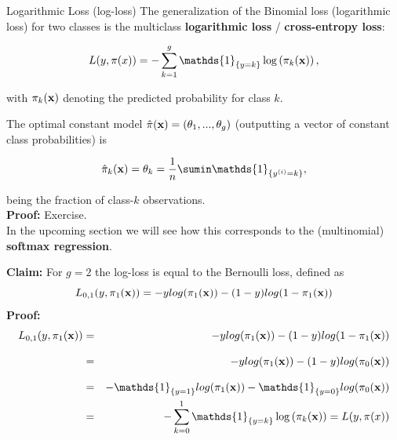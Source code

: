 \documentclass[11pt,compress,t,notes=noshow, xcolor=table]{beamer}
\begin{document}
\begin{vbframe}{Logarithmic Loss (log-loss)}
The generalization of the Binomial loss (logarithmic loss) for two classes is the multiclass \textbf{logarithmic loss} / \textbf{cross-entropy loss}:

\vspace*{-0.2cm}
\begin{footnotesize}
$$
  L(y, \pi(x)) = - \sum_{k = 1}^g \mathds{1}_{\{y = k\}} \log\left(\pi_k(\xv)\right),
$$
\end{footnotesize}
with $\pi_k(\mathbf{x})$ denoting the predicted probability for class $k$.

\vspace*{0.2cm}
 
The optimal constant model $\hat \pi(\mathbf{x}) = \left(\theta_1, ..., \theta_g\right)$ (outputting a vector of constant class probabilities) is
\begin{footnotesize}
$$
    \hat{\pi}_k(\xv) = \theta_k = \frac{1}{n} \sumin \mathds{1}_{\{\yi = k\}},   
$$
\end{footnotesize}
 being the fraction of class-$k$ observations. \\
\vspace*{0.5cm}
\textbf{Proof:} Exercise. \\
\vspace*{0.5cm}
In the upcoming section we will see how this corresponds to the (multinomial) \textbf{softmax regression}. 

\framebreak
\textbf{Claim:} For $g = 2$ the log-loss is equal to the Bernoulli loss, defined as
$$L_{0, 1}(y, \pi_1(\mathbf{x})) = -ylog(\pi_1(\mathbf{x})) - (1- y) log(1- \pi_1(\mathbf{x}))$$
\textbf{Proof:}
\begin{eqnarray*}
L_{0, 1}(y, \pi_1(\xv)) &=& -ylog(\pi_1(\xv)) - (1- y) log(1- \pi_1(\xv))\\[0.3cm]
&=& -ylog(\pi_1(\xv)) - (1- y) log(\pi_0(\xv))\\[0.3cm]
&=& -\mathds{1}_{\{y = 1\}} log(\pi_1(\xv)) - \mathds{1}_{\{y = 0\}} log(\pi_0(\xv))\\
&=& - \sum_{k = 0}^1 \mathds{1}_{\{y = k\}} \log\left(\pi_k(\xv)\right) = L(y, \pi(x))
\end{eqnarray*}
\end{vbframe}

\endlecture
\end{document}
